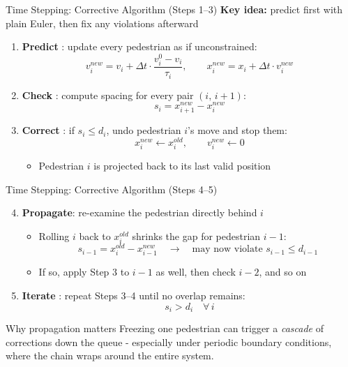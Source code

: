 \documentclass{beamer}
\begin{document}
\begin{frame}{Time Stepping: Corrective Algorithm (Steps 1--3)}
    \textbf{Key idea:} predict first with plain Euler, then fix any violations afterward
    \vspace{0.4em}
    \begin{enumerate}
        \item \textbf{Predict} : update every pedestrian as if unconstrained:
        \[
            v_i^{new} = v_i + \Delta t \cdot \frac{v_i^0 - v_i}{\tau_i}, \qquad
            x_i^{new} = x_i + \Delta t \cdot v_i^{new}
        \]

        \item \textbf{Check} : compute spacing for every pair $(i,\, i{+}1)$:
        \[
            s_i = x_{i+1}^{new} - x_i^{new}
        \]

        \item \textbf{Correct} : if $s_i \le d_i$, undo pedestrian $i$'s move and stop them:
        \[
            x_i^{new} \leftarrow x_i^{old}, \qquad v_i^{new} \leftarrow 0
        \]
        \begin{itemize}
            \item Pedestrian $i$ is projected back to its last valid position
        \end{itemize}
    \end{enumerate}
\end{frame}


\begin{frame}{Time Stepping: Corrective Algorithm (Steps 4--5)}
    \begin{enumerate}
        \setcounter{enumi}{3}
        \item \textbf{Propagate}: re-examine the pedestrian directly behind $i$
        \begin{itemize}
            \item Rolling $i$ back to $x_i^{old}$ shrinks the gap for pedestrian $i{-}1$:
            \[
                s_{i-1} = x_i^{old} - x_{i-1}^{new} \quad \longrightarrow \quad \text{may now violate } s_{i-1} \le d_{i-1}
            \]
            \item If so, apply Step 3 to $i{-}1$ as well, then check $i{-}2$, and so on
        \end{itemize}

        \item \textbf{Iterate} : repeat Steps 3--4 until no overlap remains:
        \[
            s_i > d_i \quad \forall\, i
        \]
    \end{enumerate}
    \vspace{0.5em}
    \begin{block}{Why propagation matters}
        Freezing one pedestrian can trigger a \emph{cascade} of corrections down the queue - especially under periodic boundary conditions, where the chain wraps around the entire system.
    \end{block}
\end{frame}
\end{document}
